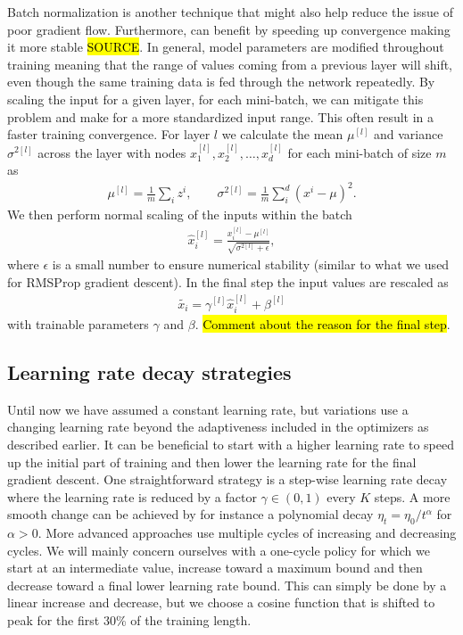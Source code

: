 Batch normalization is another technique that might also help reduce the issue of poor gradient flow. Furthermore, can benefit by speeding up convergence making it more stable \hl{SOURCE}. In general, model parameters are modified throughout training meaning that the range of values coming from a previous layer will shift, even though the same training data is fed through the network repeatedly.  By scaling the input for a given layer, for each mini-batch, we can mitigate this problem and make for a more standardized input range. This often result in a faster training convergence. For layer $l$ we calculate the mean $\mu^{[l]}$ and variance $\sigma^{2[l]}$ across the layer with nodes $x_1^{[l]}, x_2^{[l]}, \ldots, x_d^{[l]}$ for each mini-batch of size $m$ as
\begin{align*}
  \mu^{[l]} = \frac{1}{m} \sum_i z^i, \qquad \sigma^{2[l]} = \frac{1}{m} \sum_i^d (x^i-\mu)^2.
\end{align*}
We then perform normal scaling of the inputs within the batch
\begin{align*}
  \hat{x}_i^{[l]} = \frac{x_i^{[l]} - \mu^{[l]}}{\sqrt{\sigma^{2[l]} + \epsilon}},
\end{align*}
where $\epsilon$ is a small number to ensure numerical stability (similar to what we used for RMSProp gradient descent). In the final step the input values are rescaled as
\begin{align*}
  \tilde{x_i} = \gamma^{[l]} \hat{x}_i^{[l]} + \beta^{[l]}
\end{align*}
with trainable parameters $\gamma$ and $\beta$. \hl{Comment about the reason for the final step}.


\subsection{Learning rate decay strategies}
Until now we have assumed a constant learning rate, but variations use a
changing learning rate beyond the adaptiveness included in the optimizers as
described earlier. It can be beneficial to start with a higher learning rate to
speed up the initial part of training and then lower the learning rate for the
final gradient descent. One straightforward strategy is a step-wise learning
rate decay where the learning rate is reduced by a factor $\gamma \in (0,1)$
every $K$ steps. A more smooth change can be achieved by for instance a
polynomial decay $\eta_t = \eta_0/t^{\alpha}$ for $\alpha > 0$. More advanced
approaches use multiple cycles of increasing and decreasing cycles. We will
mainly concern ourselves with a one-cycle policy for which we start at an
intermediate value, increase toward a maximum bound and then decrease toward a
final lower learning rate bound. This can simply be done by a linear increase
and decrease, but we choose a cosine function that is shifted to peak for the
first 30\% of the training length. 




